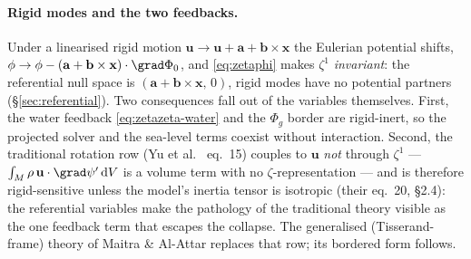 \documentclass[11pt]{article}
\numberwithin{equation}{section}
\theoremstyle{remark}
\newcommand{\dV}{\,\mathrm{d}V}
\newcommand{\vu}{\mathbf{u}}
\newcommand{\vb}{\mathbf{b}}
\newcommand{\vx}{\mathbf{x}}
\begin{document}
\paragraph{Rigid modes and the two feedbacks.} Under a linearised rigid
motion $\vu \to \vu + \mathbf{a} + \vb\times\vx$ the Eulerian potential shifts,
$\phi \to \phi - (\mathbf{a} + \vb\times\vx)\cdot\grad\Phi_0$, and
\eqref{eq:zetaphi} makes $\zeta^1$ \emph{invariant}: the referential
null space is $(\mathbf{a} + \vb\times\vx,\,0)$, rigid modes have no potential
partners (\S\ref{sec:referential}). Two consequences fall out of the
variables themselves. First, the water feedback
\eqref{eq:zetazeta-water} and the $\Phi_g$ border are rigid-inert, so
the projected solver and the sea-level terms coexist without
interaction. Second, the traditional rotation row (Yu et al.\
\cite{Yu2025} eq.~15) couples to $\vu$ \emph{not} through $\zeta^1$ ---
$\int_M \rho\,\vu\cdot\grad\psi'\dV$ is a volume term with no
$\zeta$-representation --- and is therefore rigid-sensitive unless the
model's inertia tensor is isotropic (their eq.~20, \S2.4): the
referential variables make the pathology of the traditional theory
visible as the one feedback term that escapes the collapse. The
generalised (Tisserand-frame) theory of Maitra \& Al-Attar
\cite{MaitraAlAttar2024} replaces that row; its bordered form follows.
\end{document}
